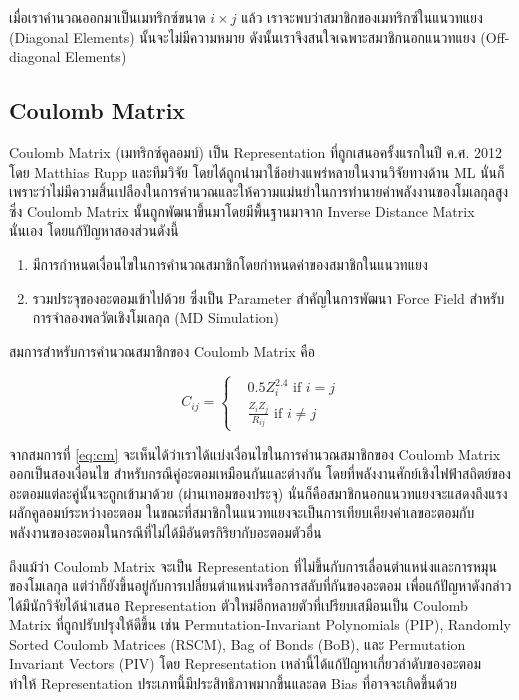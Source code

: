 เมื่อเราคำนวณออกมาเป็นเมทริกซ์ขนาด $i \times j$ แล้ว เราจะพบว่าสมาชิกของเมทริกซ์ในแนวทแยง (Diagonal Elements) นั้นจะไม่มีความหมาย 
ดังนั้นเราจึงสนใจเฉพาะสมาชิกนอกแนวทแยง (Off-diagonal Elements)

\subsection{Coulomb Matrix}

Coulomb Matrix (เมทริกซ์คูลอมบ์) เป็น Representation ที่ถูกเสนอครั้งแรกในปี ค.ศ. 2012 โดย Matthias Rupp และทีมวิจัย\citeauthor{rupp2012} 
โดยได้ถูกนำมาใช้อย่างแพร่หลายในงานวิจัยทางด้าน ML นั่นก็เพราะว่าไม่มีความสิ้นเปลืองในการคำนวณและให้ความแม่นยำในการทำนายค่าพลังงานของโมเลกุลสูง 
ซึ่ง Coulomb Matrix นั้นถูกพัฒนาขึ้นมาโดยมีพื้นฐานมาจาก Inverse Distance Matrix นั่นเอง โดยแก้ปัญหาสองส่วนดังนี้

\begin{enumerate}
    \item มีการกำหนดเงื่อนไขในการคำนวณสมาชิกโดยกำหนดค่าของสมาชิกในแนวทแยง
    \item รวมประจุของอะตอมเข้าไปด้วย ซึ่งเป็น Parameter สำคัญในการพัฒนา Force Field สำหรับการจำลองพลวัตเชิงโมเลกุล (MD Simulation)
\end{enumerate}

สมการสำหรับการคำนวณสมาชิกของ Coulomb Matrix คือ

\begin{equation}
    \label{eq:cm}
    C_{ij} =
    \begin{cases}
     & 0.5 Z_i^{2.4} \text{ if } i = j \\ 
     & \frac{Z_i Z_j}{R_{ij}} \text{ if } i \neq j
    \end{cases}
\end{equation}

จากสมการที่ \ref{eq:cm} จะเห็นได้ว่าเราได้แบ่งเงื่อนไขในการคำนวณสมาชิกของ Coulomb Matrix ออกเป็นสองเงื่อนไข สำหรับกรณีคู่อะตอมเหมือนกันและต่างกัน
โดยที่พลังงานศักย์เชิงไฟฟ้าสถิตย์ของอะตอมแต่ละคู่นั้นจะถูกเข้ามาด้วย (ผ่านเทอมของประจุ) นั่นก็คือสมาชิกนอกแนวทแยงจะแสดงถึงแรงผลักคูลอมบ์ระหว่างอะตอม
ในขณะที่สมาชิกในแนวทแยงจะเป็นการเทียบเคียงค่าเลขอะตอมกับพลังงานของอะตอมในกรณีที่ไม่ได้มีอันตรกิริยากับอะตอมตัวอื่น

ถึงแม้ว่า Coulomb Matrix จะเป็น Representation ที่ไม่ขึ้นกับการเลื่อนตำแหน่งและการหมุนของโมเลกุล แต่ว่าก็ยังขึ้นอยู่กับการเปลี่ยนตำแหน่งหรือการสลับที่กันของอะตอม
เพื่อแก้ปัญหาดังกล่าว ได้มีนักวิจัยได้นำเสนอ Representation ตัวใหม่อีกหลายตัวที่เปรียบเสมือนเป็น Coulomb Matrix ที่ถูกปรับปรุงให้ดีขึ้น เช่น  
Permutation-Invariant Polynomials (PIP)\cite{braams2009}, Randomly Sorted Coulomb Matrices (RSCM)\cite{hansen2013}, 
Bag of Bonds (BoB)\cite{hansen2013}, และ Permutation Invariant Vectors (PIV)\cite{gallet2013} 
โดย Representation เหล่านี้ได้แก้ปัญหาเกี่ยวลำดับของอะตอม ทำให้ Representation ประเภทนี้มีประสิทธิภาพมากขึ้นและลด Bias ที่อาจจะเกิดขึ้นด้วย

